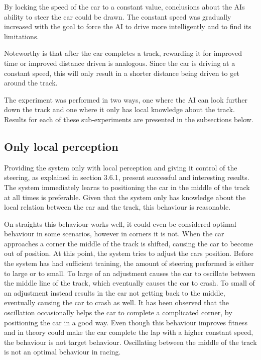 By locking the speed of the car to a constant value, conclusions about the AIs ability to steer the car could be drawn. The constant speed was gradually increased with the goal to force the AI to drive more intelligently and to find its limitations. 

Noteworthy is that after the car completes a track, rewarding it for improved time or improved distance driven is analogous. Since the car is driving at a constant speed, this will only result in a shorter distance being driven to get around the track.

The experiment was performed in two ways, one where the AI can look further down the track and one where it only has local knowledge about the track. Results for each of these sub-experiments are presented in the subsections below.

\subsection{Only local perception}
Providing the system only with local perception and giving it control of the steering, as explained in section 3.6.1, present successful and interesting results. The system immediately learns to positioning the car in the middle of the track at all times is preferable. Given that the system only has knowledge about the local relation between the car and the track, this behaviour is reasonable.

On straights this behaviour works well, it could even be considered optimal behaviour in some scenarios, however in corners it is not. When the car approaches a corner the middle of the track is shifted, causing the car to become out of position. At this point, the system tries to adjust the cars position. Before the system has had sufficient training, the amount of steering performed is either to large or to small. To large of an adjustment causes the car to oscillate between the middle line of the track, which eventually causes the car to crash. To small of an adjustment instead results in the car not getting back to the middle, eventually causing the car to crash as well. It has been observed that the oscillation occasionally helps the car to complete a complicated corner, by positioning the car in a good way. Even though this behaviour improves fitness and in theory could make the car complete the lap with a higher constant speed, the behaviour is not target behaviour. Oscillating between the middle of the track is not an optimal behaviour in racing.


